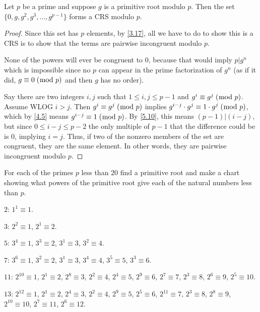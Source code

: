 \documentclass[../main.tex]{subfiles}
\begin{document}
\begin{thm} \label{6.6}
  Let $p$ be a prime and suppose $g$ is a primitive root modulo $p$. Then the set $\{0, g, g^2, g^3, \ldots, g^{p-1}\}$ forms a CRS modulo $p$.
\end{thm}

\begin{proof}
  Since this set has $p$ elements, by \ref{3.17}, all we have to do to show this is a CRS is to show that the terms are pairwise incongruent modulo $p$.

  None of the powers will ever be congruent to $0$, because that would imply $p | g^n$ which is impossible since no $p$ can appear in the prime factorization of $g^n$ (as if it did, $g \equiv 0 \; (\bmod \; p)$ and then $g$ has no order).

  Say there are two integers $i, j$ such that $1 \leq i, j \leq p-1$ and $g^i \equiv g^j \; (\bmod \; p)$. Assume WLOG $i > j$. Then $g^i \equiv g^j \; (\bmod \; p)$ implies $g^{i-j} \cdot g^j \equiv 1 \cdot g^j \; (\bmod \; p)$, which by \ref{4.5} means $g^{i-j} \equiv 1 \; (\bmod \; p)$.
  By \ref{5.10}, this means $(p-1) | (i - j)$, but since $0 \leq i - j \leq p-2$ the only multiple of $p-1$ that the difference could be is $0$, implying $i = j$. Thus, if two of the nonzero members of the set are congruent, they are the same element. In other words, they are pairwise incongruent modulo $p$.
\end{proof}



\begin{ex} \label{6.7}
  For each of the primes $p$ less than $20$ find a primitive root and make a chart showing what powers of the primitive root give each of the natural numbers less than $p$.
\end{ex}

$2$: $1^1 \equiv 1$.

$3$: $2^2 \equiv 1$, $2^1 \equiv 2$.

$5$: $3^4 \equiv 1$, $3^3 \equiv 2$, $3^1 \equiv 3$, $3^2 \equiv 4$.

$7$: $3^6 \equiv 1$, $3^2 \equiv 2$, $3^1 \equiv 3$, $3^4 \equiv 4$, $3^5 \equiv 5$, $3^3 \equiv 6$.

$11$: $2^{10} \equiv 1$, $2^1 \equiv 2$, $2^8 \equiv 3$, $2^2 \equiv 4$, $2^4 \equiv 5$, $2^9 \equiv 6$, $2^7 \equiv 7$, $2^3 \equiv 8$,
$2^6 \equiv 9$, $2^5 \equiv 10$.

$13$: $2^{12} \equiv 1$, $2^1 \equiv 2$, $2^4 \equiv 3$, $2^2 \equiv 4$, $2^9 \equiv 5$, $2^5 \equiv 6$, $2^{11} \equiv 7$, $2^3 \equiv 8$,
$2^8 \equiv 9$, $2^{10} \equiv 10$, $2^7 \equiv 11$, $2^6 \equiv 12$.
\end{document}
